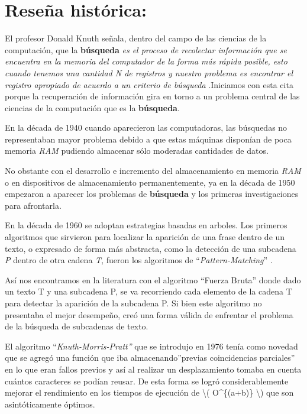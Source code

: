 \documentclass[
  12pt,
  openany]{book}
\begin{document}
\hypertarget{alghist}{%
\section{Reseña histórica:}\label{alghist}}

El profesor Donald Knuth señala, dentro del campo de las ciencias de la computación, que la \textbf{búsqueda} \emph{es el proceso de recolectar información que se encuentra en la memoria del computador de la forma más rápida posible, esto cuando tenemos una cantidad N de registros y nuestro problema es encontrar el registro apropiado de acuerdo a un criterio de búsqueda} \citep[p.392]{knuth1997} .Iniciamos con esta cita porque la recuperación de información gira en torno a un problema central de las ciencias de la computación que es la \textbf{búsqueda}.

En la década de 1940 cuando aparecieron las computadoras, las búsquedas no representaban mayor problema debido a que estas máquinas disponían de poca memoria \emph{RAM} pudiendo almacenar sólo moderadas cantidades de datos.

No obstante con el desarrollo e incremento del almacenamiento en memoria \emph{RAM} o en dispositivos de almacenamiento permanentemente, ya en la década de 1950 empezaron a aparecer los problemas de \textbf{búsqueda} y los primeras investigaciones para afrontarla.

En la década de 1960 se adoptan estrategias basadas en arboles. Los primeros algoritmos que sirvieron para localizar la aparición de una frase dentro de un texto, o expresado de forma más abstracta, como la detección de una subcadena \emph{P} dentro de otra cadena \emph{T}, fueron los algoritmos de ``\emph{Pattern-Matching}'' \citep{goodrich2013}.

Así nos encontramos en la literatura con el algoritmo ``Fuerza Bruta'' donde dado un texto T y una subcadena P, se va recorriendo cada elemento de la cadena T para detectar la aparición de la subcadena P. Si bien este algoritmo no presentaba el mejor desempeño, creó una forma válida de enfrentar el problema de la búsqueda de subcadenas de texto.

El algoritmo ``\emph{Knuth-Morris-Pratt''} que se introdujo en 1976 tenía como novedad que se agregó una función que iba almacenando''previas coincidencias parciales'' en lo que eran fallos previos y así al realizar un desplazamiento tomaba en cuenta cuántos caracteres se podían reusar. De esta forma se logró considerablemente mejorar el rendimiento en los tiempos de ejecución de \textbackslash( O\^{}\{(a+b)\} \textbackslash) que son asintóticamente óptimos.
\end{document}
